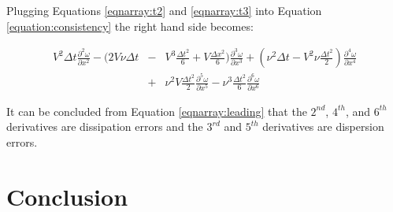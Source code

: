 \documentclass[letterpaper,12pt]{article}
\begin{document}
Plugging Equations \ref{eqnarray:t2} and \ref{eqnarray:t3} into Equation \ref{equation:consistency} the
right hand side becomes:

\begin{eqnarray}
	V^2\Delta t \frac{\partial^2 \omega}{\partial x^2} - (2V\nu\Delta t &-&V^3\frac{\Delta t^2}{6} + V\frac{\Delta x^2}{6})\frac{\partial^3 \omega}{\partial x^3} + (\nu^2\Delta t -V^2\nu\frac{\Delta t^2}{2})\frac{\partial^4 \omega}{\partial x^4} \nonumber \\
	&+& \nu^2V\frac{\Delta t^2}{2}\frac{\partial^5 \omega}{\partial x^5} - \nu^3\frac{\Delta t^2}{6}\frac{\partial^6 \omega}{\partial x^6}
	\label{eqnarray:leading}
\end{eqnarray}

It can be concluded from Equation \ref{eqnarray:leading} that the $2^{nd}$, $4^{th}$, and $6^{th}$ derivatives are dissipation errors
and the $3^{rd}$ and $5^{th}$ derivatives are dispersion errors.

\section{Conclusion}
\end{document}
